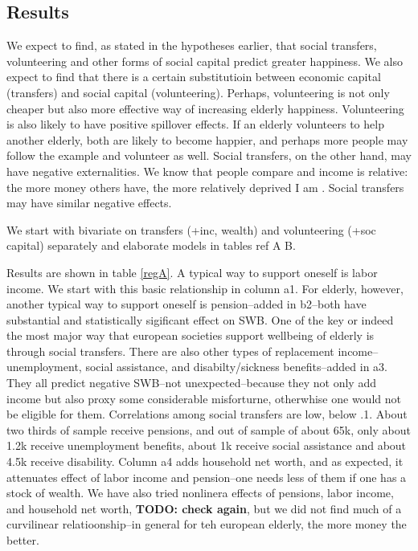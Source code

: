 \documentclass[10pt, letterpaper]{article}
\begin{document}
\begin{spacing}{1.4}
\section{Results}


 We expect to
find, as stated in the hypotheses earlier, that social transfers, volunteering
and other forms of social capital predict greater happiness. We also expect to
find that there is a  certain substitutioin  between economic capital (transfers) and social
capital (volunteering). Perhaps, volunteering is not only cheaper but also more
effective way of increasing elderly happiness. Volunteering is also likely to have
positive spillover effects. If an elderly volunteers to help another elderly,
both are  likely to become happier, and perhaps more people may follow the
example and volunteer as well. Social transfers, on the other hand, may have
negative externalities. We know that people compare and income is relative: the
more money others have, the more relatively deprived I am
\citep{michalos85,luttmer05,bender12}. Social transfers may have similar negative
effects. 


We start with bivariate on transfers (+inc, wealth) and volunteering (+soc
capital) separately and elaborate models in tables ref A B. 

Results are shown in table \ref{regA}. A typical way to support oneself is labor
income. We start with this basic relationship in column a1. For elderly,
however, another typical way to support oneself is pension--added in b2--both
have substantial and statistically sigificant effect on SWB. 
%
One of the key or indeed the most major way that european societies support
wellbeing of elderly is through social transfers.
%
There are also
other types of replacement income--unemployment, social assistance, and disabilty/sickness
benefits--added in a3. They all predict negative SWB--not unexpected--because
they not only add income but also proxy some considerable misforturne,
otherwhise one would not be eligible for them. 
%
Correlations among social transfers are low, below .1. About two thirds of sample receive pensions, and out of sample of about 65k, only about 1.2k receive
unemployment benefits,  about 1k receive social assistance and about 4.5k
receive disability.
%
Column a4 adds household net
worth, and as expected, it attenuates effect of labor income and pension--one
needs less of them if one has a stock of wealth. 
%
We have also tried nonlinera effects of pensions, labor income, and household
net worth, \textbf{TODO: check again}, but we did not find much of a curvilinear
relatioonship--in general for teh european elderly, the more money the better.


\end{spacing}
\end{document}
